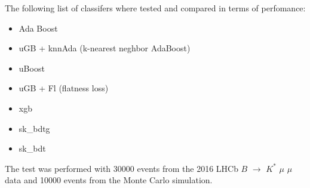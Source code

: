 \documentclass[english]{uzhpub}
\begin{document}
 The following list of classifers where tested and compared in terms of perfomance:
 \begin{itemize}
  \item Ada Boost \cite{bib:AdaBoost}
  \item uGB \cite{bib:ugb} + knnAda (k-nearest neghbor AdaBoost)
  \item uBoost \cite{bib:uBoost}
  \item uGB \cite{bib:ugb} + Fl (flatness loss)
  \item xgb \cite{bib:xgb}
  \item sk\_bdtg \cite{bib:bdtg}
  \item sk\_bdt \cite{bib:bdt}
 \end{itemize}
 The test was performed with 30000 events from the 2016 LHCb $B$ $\rightarrow$ $K^{*}$ $\mu$ $\mu$ data and 10000 events from the Monte Carlo simulation.
\end{document}
